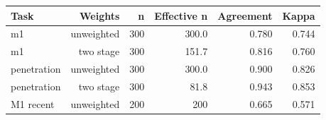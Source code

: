 \begin{tabular}{@{}lrrrrr@{}}
\toprule
Task & Weights & n & Effective n & Agreement & Kappa \\
\midrule
m1 & unweighted & 300 & 300.0 & 0.780 & 0.744 \\
m1 & two stage & 300 & 151.7 & 0.816 & 0.760 \\
penetration & unweighted & 300 & 300.0 & 0.900 & 0.826 \\
penetration & two stage & 300 & 81.8 & 0.943 & 0.853 \\
M1 recent & unweighted & 200 & 200 & 0.665 & 0.571 \\
\bottomrule
\end{tabular}
